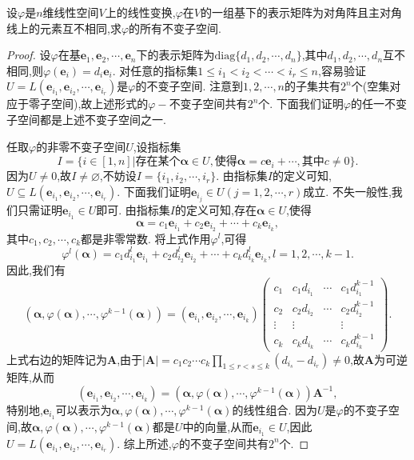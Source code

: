 \documentclass[lang=cn,newtx,10pt,scheme=chinese]{elegantbook}
\begin{document}
\begin{example}
设\(\varphi\)是\(n\)维线性空间\(V\)上的线性变换,\(\varphi\)在\(V\)的一组基下的表示矩阵为对角阵且主对角线上的元素互不相同,求\(\varphi\)的所有不变子空间.
\end{example}
\begin{proof}
设\(\varphi\)在基\(\boldsymbol{e}_1,\boldsymbol{e}_2,\cdots,\boldsymbol{e}_n\)下的表示矩阵为\(\text{diag}\{d_1,d_2,\cdots,d_n\}\),其中\(d_1,d_2,\cdots,d_n\)互不相同,则\(\varphi(\boldsymbol{e}_i)=d_i\boldsymbol{e}_i\). 对任意的指标集\(1\leq i_1 < i_2 < \cdots < i_r\leq n\),容易验证\(U = L(\boldsymbol{e}_{i_1},\boldsymbol{e}_{i_2},\cdots,\boldsymbol{e}_{i_r})\)是\(\varphi\)的不变子空间. 注意到\(1,2,\cdots,n\)的子集共有\(2^n\)个(空集对应于零子空间),故上述形式的\(\varphi -\)不变子空间共有\(2^n\)个. 下面我们证明\(\varphi\)的任一不变子空间都是上述不变子空间之一.

任取\(\varphi\)的非零不变子空间\(U\),设指标集
\[
I = \{i\in[1,n]|\text{存在某个}\boldsymbol{\alpha}\in U,\text{使得}\boldsymbol{\alpha}=c\boldsymbol{e}_i + \cdots,\text{其中}c\neq 0\}.
\]
因为\(U\neq 0\),故\(I\neq\varnothing\),不妨设\(I = \{i_1,i_2,\cdots,i_r\}\). 由指标集\(I\)的定义可知,\(U\subseteq L(\boldsymbol{e}_{i_1},\boldsymbol{e}_{i_2},\cdots,\boldsymbol{e}_{i_r})\). 下面我们证明\(\boldsymbol{e}_{i_j}\in U(j = 1,2,\cdots,r)\)成立. 不失一般性,我们只需证明\(\boldsymbol{e}_{i_1}\in U\)即可. 由指标集\(I\)的定义可知,存在\(\boldsymbol{\alpha}\in U\),使得
\[
\boldsymbol{\alpha}=c_1\boldsymbol{e}_{i_1}+c_2\boldsymbol{e}_{i_2}+\cdots + c_k\boldsymbol{e}_{i_k},
\]
其中\(c_1,c_2,\cdots,c_k\)都是非零常数. 将上式作用\(\varphi^l\),可得
\[
\varphi^l(\boldsymbol{\alpha})=c_1d_{i_1}^l\boldsymbol{e}_{i_1}+c_2d_{i_2}^l\boldsymbol{e}_{i_2}+\cdots + c_kd_{i_k}^l\boldsymbol{e}_{i_k},l = 1,2,\cdots,k - 1.
\]
因此,我们有
\[
(\boldsymbol{\alpha},\varphi(\boldsymbol{\alpha}),\cdots,\varphi^{k - 1}(\boldsymbol{\alpha}))=(\boldsymbol{e}_{i_1},\boldsymbol{e}_{i_2},\cdots,\boldsymbol{e}_{i_k})
\begin{pmatrix}
c_1&c_1d_{i_1}&\cdots&c_1d_{i_1}^{k - 1}\\
c_2&c_2d_{i_2}&\cdots&c_2d_{i_2}^{k - 1}\\
\vdots&\vdots&&\vdots\\
c_k&c_kd_{i_k}&\cdots&c_kd_{i_k}^{k - 1}
\end{pmatrix}.
\]
上式右边的矩阵记为\(\boldsymbol{A}\),由于\(|\boldsymbol{A}| = c_1c_2\cdots c_k\prod_{1\leq r < s\leq k}(d_{i_s}-d_{i_r})\neq 0\),故\(\boldsymbol{A}\)为可逆矩阵,从而
\[
(\boldsymbol{e}_{i_1},\boldsymbol{e}_{i_2},\cdots,\boldsymbol{e}_{i_k})=(\boldsymbol{\alpha},\varphi(\boldsymbol{\alpha}),\cdots,\varphi^{k - 1}(\boldsymbol{\alpha}))\boldsymbol{A}^{-1},
\]
特别地,\(\boldsymbol{e}_{i_1}\)可以表示为\(\boldsymbol{\alpha},\varphi(\boldsymbol{\alpha}),\cdots,\varphi^{k - 1}(\boldsymbol{\alpha})\)的线性组合. 因为\(U\)是\(\varphi\)的不变子空间,故\(\boldsymbol{\alpha},\varphi(\boldsymbol{\alpha}),\cdots,\varphi^{k - 1}(\boldsymbol{\alpha})\)都是\(U\)中的向量,从而\(\boldsymbol{e}_{i_1}\in U\),因此\(U = L(\boldsymbol{e}_{i_1},\boldsymbol{e}_{i_2},\cdots,\boldsymbol{e}_{i_r})\). 综上所述,\(\varphi\)的不变子空间共有\(2^n\)个. 
\end{proof}
\end{document}
